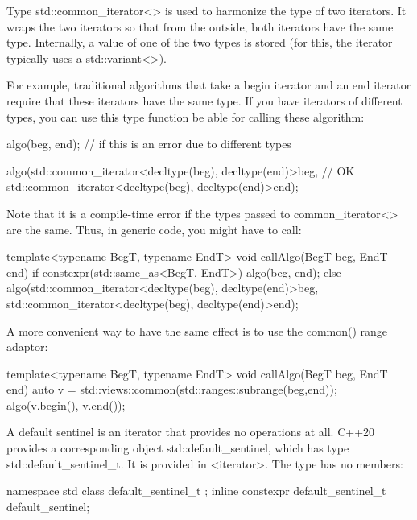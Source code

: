 
Type std::common\_iterator<> is used to harmonize the type of two iterators. It wraps the two iterators so that from the outside, both iterators have the same type. Internally, a value of one of the two types is stored (for this, the iterator typically uses a std::variant<>).

For example, traditional algorithms that take a begin iterator and an end iterator require that these iterators have the same type. If you have iterators of different types, you can use this type function be able for calling these algorithm:

\begin{cpp}
algo(beg, end); // if this is an error due to different types

algo(std::common_iterator<decltype(beg), decltype(end)>{beg}, // OK
std::common_iterator<decltype(beg), decltype(end)>{end});
\end{cpp}

Note that it is a compile-time error if the types passed to common\_iterator<> are the same. Thus, in generic code, you might have to call:

\begin{cpp}
template<typename BegT, typename EndT>
void callAlgo(BegT beg, EndT end)
{
	if constexpr(std::same_as<BegT, EndT>) {
		algo(beg, end);
	}
	else {
		algo(std::common_iterator<decltype(beg), decltype(end)>{beg},
		std::common_iterator<decltype(beg), decltype(end)>{end});
	}
}
\end{cpp}

A more convenient way to have the same effect is to use the common() range adaptor:

\begin{cpp}
template<typename BegT, typename EndT>
void callAlgo(BegT beg, EndT end)
{
	auto v = std::views::common(std::ranges::subrange(beg,end));
	algo(v.begin(), v.end());
}
\end{cpp}


A default sentinel is an iterator that provides no operations at all. C++20 provides a corresponding object std::default\_sentinel, which has type std::default\_sentinel\_t. It is provided in <iterator>. The type has no members:

\begin{cpp}
namespace std {
	class default_sentinel_t {
	};
	inline constexpr default_sentinel_t default_sentinel{};
}
\end{cpp}

